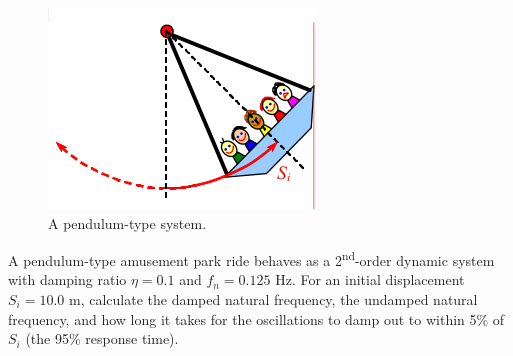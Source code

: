\documentclass[a4paper,11pt]{book}
\begin{document}
\begin{question}

\begin{figure}[h!]\label{fig:freebody}
\centering
  \includegraphics[width=0.3\linewidth]{penduleum}
  \caption{A pendulum-type system.} 
\end{figure}

A pendulum-type amusement park ride
behaves as a 2\textsuperscript{nd}-order dynamic system with damping ratio $\eta = 0.1$ and $f_n = 0.125$ Hz. For an initial displacement $S_i = 10.0$ m, calculate the damped natural frequency, the undamped natural frequency, and how long it takes for the oscillations to damp out to within 5\% of $S_i$ (the 95\% response time).

\examspace*{10em}

\end{question}
\begin{solution}


\end{solution}
\end{document}
